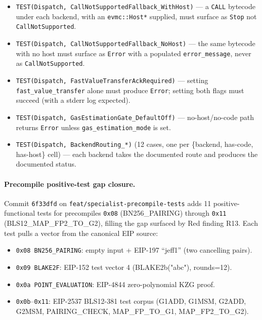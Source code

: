 \begin{itemize}
  \item \texttt{TEST(Dispatch, CallNotSupportedFallback\_WithHost)}
    --- a \texttt{CALL} bytecode under each backend, with an
    \texttt{evmc::Host*} supplied, must surface as \texttt{Stop} not
    \texttt{CallNotSupported}.
  \item \texttt{TEST(Dispatch, CallNotSupportedFallback\_NoHost)}
    --- the same bytecode with no host must surface as \texttt{Error}
    with a populated \texttt{error\_message}, never as
    \texttt{CallNotSupported}.
  \item \texttt{TEST(Dispatch, FastValueTransferAckRequired)} ---
    setting \texttt{fast\_value\_transfer} alone must produce
    \texttt{Error}; setting both flags must succeed (with a stderr
    log expected).
  \item \texttt{TEST(Dispatch, GasEstimationGate\_DefaultOff)} ---
    no-host/no-code path returns \texttt{Error} unless
    \texttt{gas\_estimation\_mode} is set.
  \item \texttt{TEST(Dispatch, BackendRouting\_*)} (12 cases, one per
    \{backend, has-code, has-host\} cell) --- each backend takes the
    documented route and produces the documented status.
\end{itemize}

\paragraph{Precompile positive-test gap closure.}
Commit \texttt{6f33dfd} on \texttt{feat/specialist-precompile-tests}
adds 11 positive-functional tests for precompiles \texttt{0x08}
(BN256\_PAIRING) through \texttt{0x11} (BLS12\_MAP\_FP2\_TO\_G2),
filling the gap surfaced by Red finding R13. Each test pulls a vector
from the canonical EIP source:

\begin{itemize}
  \item \texttt{0x08 BN256\_PAIRING}: empty input + EIP-197 ``jeff1''
    (two cancelling pairs).
  \item \texttt{0x09 BLAKE2F}: EIP-152 test vector 4
    (BLAKE2b("abc"), rounds=12).
  \item \texttt{0x0a POINT\_EVALUATION}: EIP-4844 zero-polynomial
    KZG proof.
  \item \texttt{0x0b}--\texttt{0x11}: EIP-2537 BLS12-381 test
    corpus (G1ADD, G1MSM, G2ADD, G2MSM, PAIRING\_CHECK,
    MAP\_FP\_TO\_G1, MAP\_FP2\_TO\_G2).
\end{itemize}

